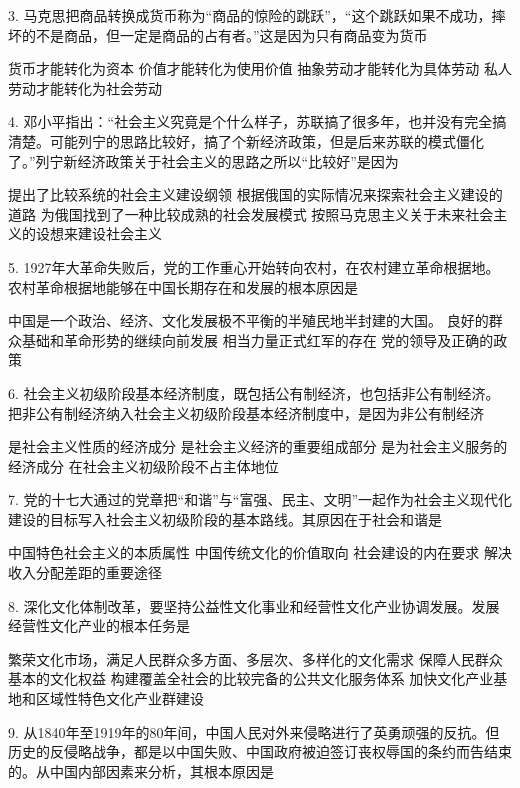 3. 马克思把商品转换成货币称为“商品的惊险的跳跃”，“这个跳跃如果不成功，摔坏的不是商品，但一定是商品的占有者。”这是因为只有商品变为货币
\begin{choices}
	 货币才能转化为资本
	 价值才能转化为使用价值
	 抽象劳动才能转化为具体劳动
	 私人劳动才能转化为社会劳动
\end{choices}
4. 邓小平指出：“社会主义究竟是个什么样子，苏联搞了很多年，也并没有完全搞清楚。可能列宁的思路比较好，搞了个新经济政策，但是后来苏联的模式僵化了。”列宁新经济政策关于社会主义的思路之所以“比较好”是因为
\begin{choices}
	 提出了比较系统的社会主义建设纲领
	 根据俄国的实际情况来探索社会主义建设的道路
	 为俄国找到了一种比较成熟的社会发展模式
	 按照马克思主义关于未来社会主义的设想来建设社会主义
\end{choices}
5. 1927年大革命失败后，党的工作重心开始转向农村，在农村建立革命根据地。农村革命根据地能够在中国长期存在和发展的根本原因是
\begin{choices}
	 中国是一个政治、经济、文化发展极不平衡的半殖民地半封建的大国。
	 良好的群众基础和革命形势的继续向前发展
	 相当力量正式红军的存在
	 党的领导及正确的政策
\end{choices}
6. 社会主义初级阶段基本经济制度，既包括公有制经济，也包括非公有制经济。把非公有制经济纳入社会主义初级阶段基本经济制度中，是因为非公有制经济
\begin{choices}
	 是社会主义性质的经济成分
	 是社会主义经济的重要组成部分
	 是为社会主义服务的经济成分
	 在社会主义初级阶段不占主体地位
\end{choices}
7. 党的十七大通过的党章把“和谐”与“富强、民主、文明”一起作为社会主义现代化建设的目标写入社会主义初级阶段的基本路线。其原因在于社会和谐是
\begin{choices}
	 中国特色社会主义的本质属性
	 中国传统文化的价值取向
	 社会建设的内在要求
	 解决收入分配差距的重要途径
\end{choices}
8. 深化文化体制改革，要坚持公益性文化事业和经营性文化产业协调发展。发展经营性文化产业的根本任务是
\begin{choices}
	 繁荣文化市场，满足人民群众多方面、多层次、多样化的文化需求
	 保障人民群众基本的文化权益
	 构建覆盖全社会的比较完备的公共文化服务体系
	 加快文化产业基地和区域性特色文化产业群建设
\end{choices}
9. 从1840年至1919年的80年间，中国人民对外来侵略进行了英勇顽强的反抗。但历史的反侵略战争，都是以中国失败、中国政府被迫签订丧权辱国的条约而告结束的。从中国内部因素来分析，其根本原因是
